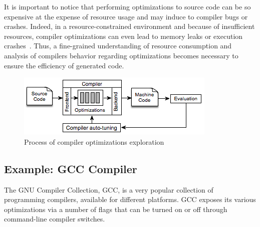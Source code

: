 It is important to notice that performing optimizations to source code can be so expensive at the expense of resource usage and may induce to compiler bugs or crashes. 
Indeed, in a resource-constrained environment and because of insufficient resources, compiler optimizations can even lead to memory leaks or execution crashes~\cite{yang2011finding}. 
Thus, a fine-grained understanding of resource consumption and analysis of compilers behavior regarding optimizations becomes necessary to ensure the efficiency of generated code.
\begin{figure}[h]
	\centering
	\includegraphics[width=1\hsize]{Ressources/autotuning.png}
	\caption{Process of compiler optimizations exploration}
\end{figure}
\subsection{Example: GCC Compiler}

The GNU Compiler Collection, GCC, is a very popular collection of programming compilers, available for different platforms.
GCC exposes its various optimizations via a number of flags that can be turned on or off through command-line compiler switches. 

